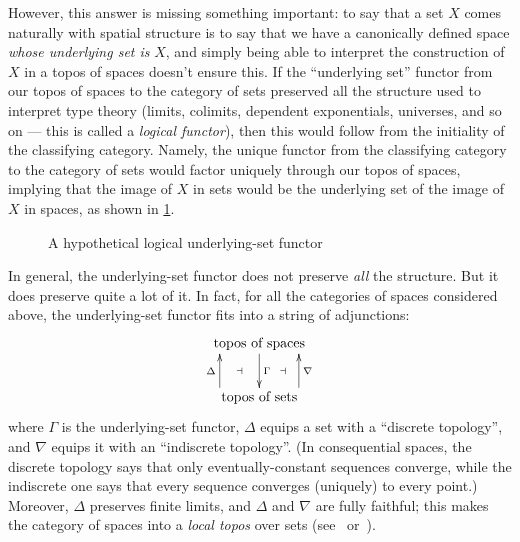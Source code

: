 \documentclass[12pt]{article}
\def\m#1{\llbracket#1\rrbracket}
\numberwithin{equation}{section}
\begin{document}
However, this answer is missing something important: to say that a set $X$ comes naturally with spatial structure is to say that we have a canonically defined space \emph{whose underlying set is} $X$, and simply being able to interpret the construction of $X$ in a topos of spaces doesn't ensure this.
%
If the ``underlying set'' functor from our topos of spaces to the category of sets preserved all the structure used to interpret type theory (limits, colimits, dependent exponentials, universes, and so on --- this is called a \emph{logical functor}), then this would follow from the initiality of the classifying category.
Namely, the unique functor from the classifying category to the category of sets would factor uniquely through our topos of spaces, implying that the image of $X$ in sets would be the underlying set of the image of $X$ in spaces, as shown in \cref{fig:logical-underlying}.

\begin{figure}
  \centering
\caption{A hypothetical logical underlying-set functor}
\label{fig:logical-underlying}
\end{figure}

In general, the underlying-set functor does not preserve \emph{all} the structure.
But it does preserve quite a lot of it.
In fact, for all the categories of spaces considered above, the underlying-set functor fits into a string of adjunctions:
\[
\xymatrix{ \text{topos of spaces} \ar[d]^\Gamma \\ \text{topos of sets}
  \ar@<10mm>[u]^{\Delta} \ar@<5mm>@{}[u]|{\dashv} \ar@<-6mm>@{}[u]|{\dashv} \ar@<-10mm>[u]_{\nabla}  }
\]
where $\Gamma$ is the underlying-set functor, $\Delta$ equips a set with a ``discrete topology'', and $\nabla$ equips it with an ``indiscrete topology''.
(In consequential spaces, the discrete topology says that only eventually-constant sequences converge, while the indiscrete one says that every sequence converges (uniquely) to every point.)
Moreover, $\Delta$ preserves finite limits, and $\Delta$ and $\nabla$ are fully faithful; this makes the category of spaces into a \emph{local topos} over sets (see~\cite{jm:local-toposes} or~\cite[\S C3.6]{ptj:elephant}).
\end{document}
